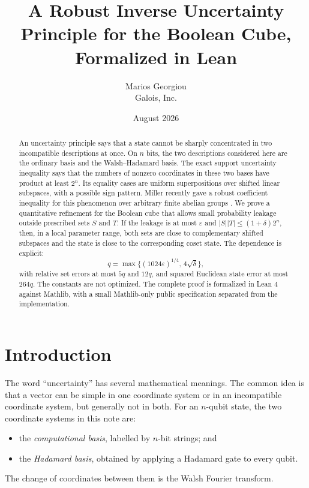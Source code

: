 \documentclass[11pt]{article}
\title{A Robust Inverse Uncertainty Principle for the Boolean Cube,\\
Formalized in Lean}
\author{Marios Georgiou\\Galois, Inc.}
\date{August 2026}
\theoremstyle{remark}
\newcommand{\1}{\mathbf 1}
\begin{document}
\maketitle

\begin{abstract}
An uncertainty principle says that a state cannot be sharply concentrated in
two incompatible descriptions at once. On $n$ bits, the two descriptions
considered here are the ordinary basis and the Walsh--Hadamard basis. The
exact support uncertainty inequality says that the numbers of nonzero
coordinates in these two bases have product at least $2^n$. Its equality
cases are uniform superpositions over shifted linear subspaces, with a
possible sign pattern. Miller recently gave a robust coefficient inequality
for this phenomenon over arbitrary finite abelian groups
\cite{Miller2026}. We prove a quantitative refinement for the Boolean cube
that allows small probability leakage outside prescribed sets $S$ and $T$.
If the leakage is at most $\varepsilon$ and
$|S||T|\leq(1+\delta)2^n$, then, in a local parameter range, both sets are
close to complementary shifted subspaces and the state is close to the
corresponding coset state. The dependence is explicit:
\[
 q=\max\{(1024\varepsilon)^{1/4},\,4\sqrt{\delta}\},
\]
with relative set errors at most $5q$ and $12q$, and squared Euclidean state
error at most $264q$. The constants are not optimized. The complete proof is
formalized in Lean 4 against Mathlib, with a small Mathlib-only public
specification separated from the implementation.
\end{abstract}

\section{Introduction}

The word ``uncertainty'' has several mathematical meanings. The common idea
is that a vector can be simple in one coordinate system or in an
incompatible coordinate system, but generally not in both. For an $n$-qubit
state, the two coordinate systems in this note are:
\begin{itemize}
  \item the \emph{computational basis}, labelled by $n$-bit strings; and
  \item the \emph{Hadamard basis}, obtained by applying a Hadamard gate to
  every qubit.
\end{itemize}
The change of coordinates between them is the Walsh Fourier transform.
\end{document}
